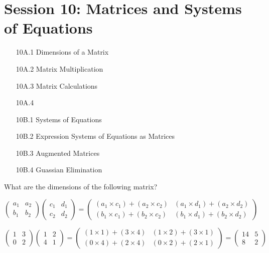 \documentclass{article}
\begin{document}
\section*{Session 10: Matrices and Systems of Equations}
\begin{itemize}
\item[10A.1] Dimensions of a Matrix
\item[10A.2] Matrix Multiplication
\item[10A.3] Matrix Calculations
\item[10A.4] 
\end{itemize}

\begin{itemize}
\item[10B.1] Systems of Equations
\item[10B.2] Expression Systems of Equations as Matrices
\item[10B.3] Augmented Matrices
\item[10B.4] Guassian Elimination
\end{itemize}


\newpage
What are the dimensions of the following matrix?


\[ \left(
\begin{array}{cc}
a_1 & a_2 \\ 
b_1 & b_2
\end{array} \right)\left(
\begin{array}{cc}
c_1 & d_1 \\ 
c_2 & d_2
\end{array} \right) = \left(
\begin{array}{cc}
(a_1 \times c_1) + (a_2 \times c_2) & (a_1 \times d_1) + (a_2 \times d_2) \\ 
(b_1 \times c_1) + (b_2 \times c_2) & (b_1 \times d_1) + (b_2 \times d_2)
\end{array} \right) \]

\bigskip
\large{
\[ \left(
\begin{array}{cc}
1 & 3 \\ 
0 & 2
\end{array} \right)\left(
\begin{array}{cc}
1 & 2 \\ 
4 & 1
\end{array} \right) = \left(
\begin{array}{cc}
(1 \times 1) + (3 \times 4) & (1 \times 2) + (3 \times 1) \\ 
(0 \times 4) + (2 \times 4) & (0 \times 2) + (2 \times 1)
\end{array} \right) = \left(
\begin{array}{cc}
14 & 5 \\ 
8 & 2
\end{array} \right) \]
}
\end{document}

